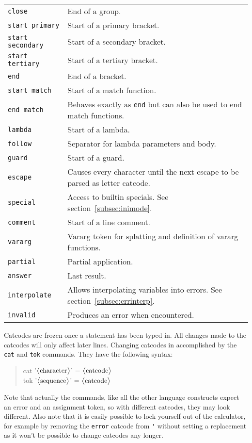 \documentclass[10pt]{article}
\newcommand{\argument}[1]{{${\big<}\text{\textrm{#1}}{\big>}$}}
\newenvironment{code}{\begin{quote}\ttfamily}{\end{quote}}
\begin{document}
\begin{longtable}{p{}p{}}
        \verb|close|           & End of a group. \\
        \verb|start primary|   & Start of a primary bracket. \\
        \verb|start secondary| & Start of a secondary bracket. \\
        \verb|start tertiary|  & Start of a tertiary bracket. \\
        \verb|end|             & End of a bracket. \\
        \verb|start match|     & Start of a match function. \\
        \verb|end match|       & Behaves exactly as \verb|end| but can also be used to end match functions. \\
        \verb|lambda|          & Start of a lambda. \\
        \verb|follow|          & Separator for lambda parameters and body. \\
        \verb|guard |          & Start of a guard. \\
        \verb|escape|          & Causes every character until the next escape to be parsed as letter catcode. \\
        \verb|special|         & Access to builtin specials. See section~\ref{subsec:inimode}. \\
        \verb|comment|         & Start of a line comment. \\
        \verb|vararg|          & Vararg token for splatting and definition of vararg functions. \\
        \verb|partial|         & Partial application. \\
        \verb|answer|          & Last result. \\
        \verb|interpolate|     & Allows interpolating variables into errors. See section~\ref{subsec:errinterp}. \\
        \verb|invalid|         & Produces an error when encountered. \\
    \end{longtable}
    Catcodes are frozen once a statement has been typed in.
    All changes made to the catcodes will only affect later lines.
    Changing catcodes in accomplished by the \verb|cat| and \verb|tok| commands.
    They have the following syntax:
    \begin{code}
        cat '\argument{character}' = \argument{catcode} \\
        tok '\argument{sequence}' = \argument{catcode}
    \end{code}
    Note that actually the commands, like all the other language constructs expect an error and an assignment token, so with different catcodes, they may look different.
    Also note that it is easily possible to lock yourself out of the calculator, for example by removing the \verb|error| catcode from \verb|'| without setting a replacement as it won't be possible to change catcodes any longer.
    
\end{document}
